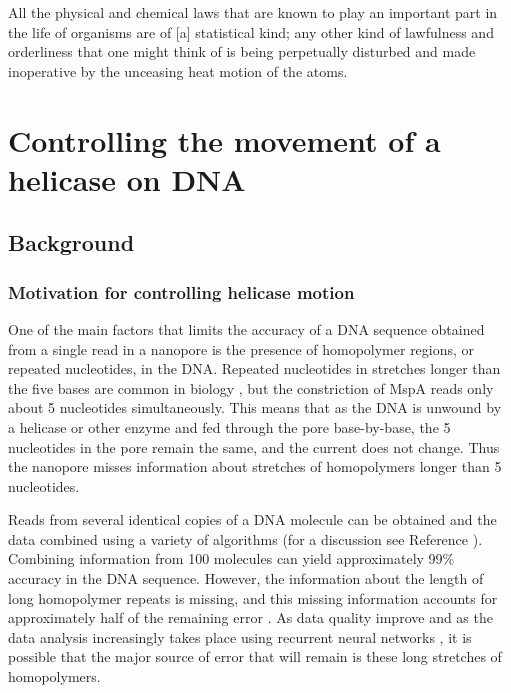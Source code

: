 \begin{savequote}[75mm]
All the physical and chemical laws that are known to play an important part in the life of organisms are of [a] statistical kind; any other kind of lawfulness and orderliness that one might think of is being perpetually disturbed and made inoperative by the unceasing heat motion of the atoms.
\end{savequote}

\chapter{Controlling the movement of a helicase on DNA}
\label{helicase_motion_control}

\section{Background}

\subsection{Motivation for controlling helicase motion}

One of the main factors that limits the accuracy of a DNA sequence obtained from a single read in a nanopore is the presence of homopolymer regions, or repeated nucleotides, in the DNA.  Repeated nucleotides in stretches longer than the five bases are common in biology \citep{Dechering1998}, but the constriction of MspA reads only about \num{5} nucleotides simultaneously.  This means that as the DNA is unwound by a helicase or other enzyme and fed through the pore base-by-base, the \num{5} nucleotides in the pore remain the same, and the current does not change.  Thus the nanopore misses information about stretches of homopolymers longer than \num{5} nucleotides.

Reads from several identical copies of a DNA molecule can be obtained and the data combined using a variety of algorithms (for a discussion see Reference ).  Combining information from \num{100} molecules can yield approximately \num{99}\% accuracy in the DNA sequence.  However, the information about the length of long homopolymer repeats is missing, and this missing information accounts for approximately half of the remaining error \citep{Szalay2015}.  As data quality improve and as the data analysis increasingly takes place using recurrent neural networks \citep{Boza2017}, it is possible that the major source of error that will remain is these long stretches of homopolymers.

